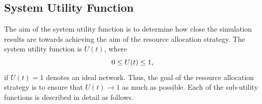 \documentclass[journal]{IEEEtran}  %
\begin{document}
\subsection{System Utility Function}
The aim of the system utility function is to determine how close the
simulation results are towards achieving the aim of the resource allocation
strategy.
The system utility function is $U(t)$, where
\begin{equation}
\centering
0 \leq U(t) \leq 1,
\end{equation}
if $U(t) = 1$ denotes an ideal network.
Thus, the goal of the resource allocation strategy is to ensure that $U(t)
  \rightarrow 1$ as much as possible.
Each of the sub-utility functions is described in detail as follows.
\end{document}
